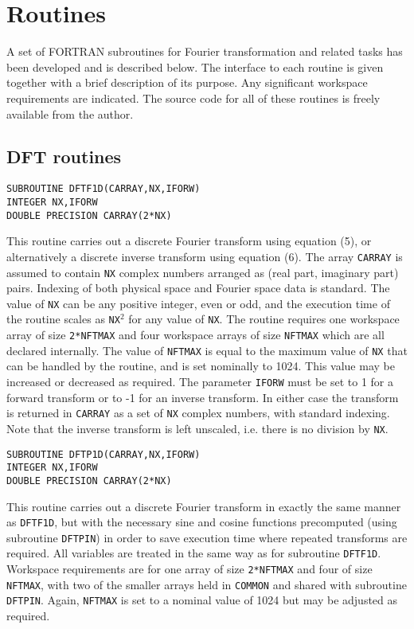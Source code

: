 \documentclass[dvips]{article}
\begin{document}
\newpage
\section*{Routines}
A set of FORTRAN subroutines for Fourier transformation and
related tasks has been developed and is described below.  The interface
to each routine is given together with a brief description of its
purpose.  Any significant workspace requirements are indicated.  The
source code for all of these routines is freely available from the author.

\subsection*{DFT routines}
\begin{verbatim}
SUBROUTINE DFTF1D(CARRAY,NX,IFORW)
INTEGER NX,IFORW
DOUBLE PRECISION CARRAY(2*NX)
\end{verbatim}
This routine carries out a discrete Fourier transform using equation (5),
or alternatively a discrete inverse transform using equation (6).  The
array {\tt CARRAY} is assumed to contain {\tt NX} complex numbers
arranged as (real part, imaginary part) pairs.  Indexing of both
physical space and Fourier space data is standard.  The value of {\tt NX} can
be any positive integer, even or odd, and the execution time of
the routine scales as {\tt NX}$^{2}$ for any value of {\tt NX}.
The routine requires one workspace array of size {\tt 2*NFTMAX} and four
workspace arrays of size {\tt NFTMAX} which are all declared internally.  The
value of {\tt NFTMAX} is equal to the maximum value of {\tt NX} that can be
handled by the routine, and is set nominally to 1024.
This value may be increased or decreased as required.
The parameter {\tt IFORW} must be set to 1
for a forward transform or to -1 for an inverse transform.  In either
case the transform is returned in {\tt CARRAY} as a set of {\tt NX} complex
numbers, with standard indexing.
Note that the inverse transform is left unscaled, i.e. there is no
division by {\tt NX}.\\

\begin{verbatim}
SUBROUTINE DFTP1D(CARRAY,NX,IFORW)
INTEGER NX,IFORW
DOUBLE PRECISION CARRAY(2*NX)
\end{verbatim}
This routine carries out a discrete Fourier transform in exactly the
same manner as {\tt DFTF1D}, but with the necessary sine and cosine
functions precomputed (using subroutine {\tt DFTPIN}) in order to save
execution time where repeated transforms are required.
All variables are treated in the same way as for subroutine {\tt DFTF1D}.
Workspace requirements are for one array of size {\tt 2*NFTMAX} and four
of size {\tt NFTMAX}, with two of the smaller arrays held in {\tt COMMON}
and shared with subroutine {\tt DFTPIN}.
Again, {\tt NFTMAX} is set to a nominal value of 1024 but may be adjusted
as required.\\
\end{document}
